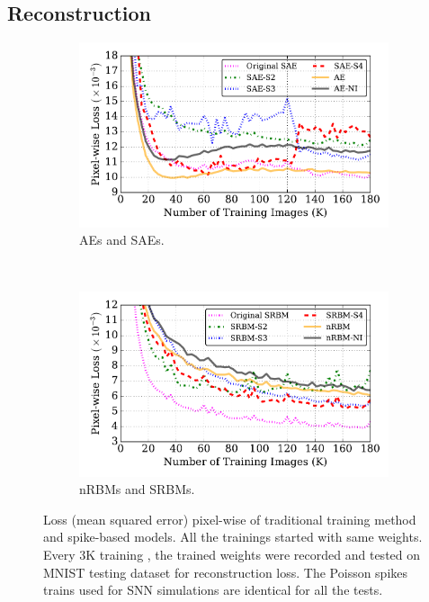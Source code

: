 \subsection{Reconstruction}

\begin{figure}
	\centering
	\begin{subfigure}[t]{0.8\textwidth}
		\includegraphics[width=\textwidth]{pics_sdlm/53_MNIST_SRBM_all/compare_recon.pdf}
		\caption{AEs and SAEs.}
	\end{subfigure}\\
	\begin{subfigure}[t]{0.8\textwidth}
		\includegraphics[width=\textwidth]{pics_sdlm/53_MNIST_SRBM_all/compare_recon_rbm.pdf}
		\caption{nRBMs and SRBMs.}
	\end{subfigure}
	\caption{Loss (mean squared error) pixel-wise of \DIFaddbeginFL {}\DIFaddendFL traditional training method and spike-based models. All the trainings started with same \DIFaddbeginFL {}\DIFaddendFL weights\DIFdelbeginFL {}\DIFdelendFL . Every 3K \DIFdelbeginFL {}\DIFdelendFL training \DIFaddbeginFL {}\DIFaddendFL , the trained weights were recorded and tested on \DIFaddbeginFL {}\DIFaddendFL MNIST testing dataset for reconstruction loss. The Poisson spikes trains used for SNN simulations are identical for all the tests.}
	\label{fig:sdlm_loss}
\end{figure}

